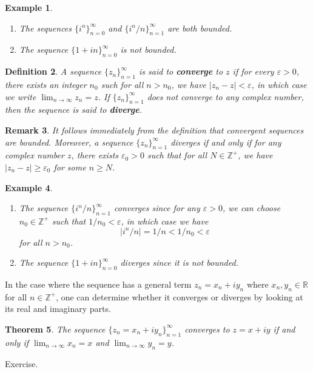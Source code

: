 \documentclass[10pt]{article}
\makeatletter
\newcommand{\eps}{\varepsilon}
\newcommand{\R}{\mathbb{R}}
\newcommand{\Z}{\mathbb{Z}}
\theoremstyle{newstyle}
\newtheorem{thm}{Theorem}[section]
\newtheorem{remark}[thm]{Remark}
\newtheorem{defn}[thm]{Definition}
\newtheorem{exmp}[thm]{Example}
\newenvironment{pf}[1][\proofname]{\par
  \pushQED{\qed}%
  \normalfont \topsep0\p@\relax
  \trivlist
  \item[\hskip\labelsep\scshape
  #1\@addpunct{.}]\ignorespaces
}{%
  \popQED\endtrivlist\@endpefalse
}
\makeatother
\begin{document}
\begin{exmp}~
\begin{enumerate}[(1)]
    \item The sequences $\{i^n\}_{n=0}^\infty$ and $\{i^n/n\}_{n=1}^\infty$ are both bounded. 
    \item The sequence $\{1+in\}_{n=0}^\infty$ is not bounded. 
\end{enumerate}
\end{exmp}

\begin{defn}
A sequence $\{z_n\}_{n=1}^\infty$ is said to {\bf converge} to $z$ if for every $\eps > 0$, 
there exists an integer $n_0$ such for all $n > n_0$, we have $|z_n - z| < \eps$, 
in which case we write $\lim_{n\to\infty} z_n = z$. If $\{z_n\}_{n=1}^\infty$ 
does not converge to any complex number, then the sequence is said to {\bf diverge}. 
\end{defn}

\begin{remark}
It follows immediately from the definition that convergent sequences are bounded. 
Moreover, a sequence $\{z_n\}_{n=1}^\infty$ diverges if and only if for any complex number $z$, 
there exists $\eps_0 > 0$ such that for all $N \in \Z^+$, we have $|z_n - z| \geq \eps_0$ for some 
$n \geq N$. 
\end{remark}

\begin{exmp}~
\begin{enumerate}[(1)]
    \item The sequence $\{i^n/n\}_{n=1}^\infty$ converges since for any $\eps > 0$, 
    we can choose $n_0 \in \Z^+$ such that $1/n_0 < \eps$, in which case we have 
    \[ |i^n/n| = 1/n < 1/n_0 < \eps \]
    for all $n > n_0$. 
    \item The sequence $\{1+in\}_{n=0}^\infty$ diverges since it is not bounded. 
\end{enumerate}
\end{exmp}

In the case where the sequence has a general term $z_n = x_n + iy_n$ where $x_n, y_n \in \R$ for all 
$n \in \Z^+$, one can determine whether it converges or diverges by looking at its real and imaginary 
parts. 

\begin{thm}
The sequence $\{z_n = x_n + iy_n\}_{n=1}^\infty$ converges to $z = x+iy$ if and only if 
$\lim_{n\to\infty} x_n = x$ and $\lim_{n\to\infty} y_n = y$. 
\end{thm}
\begin{pf}
Exercise. 
\end{pf}
\end{document}
